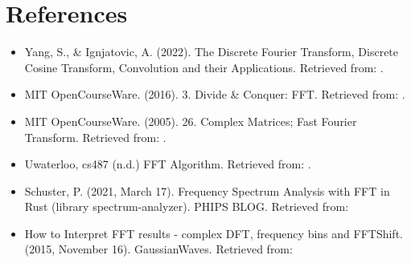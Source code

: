 \documentclass[12pt]{article}
\begin{document}
	\section{References}
 		\begin{itemize}
 			\item Yang, S., \& Ignjatovic, A. (2022). The Discrete Fourier Transform, Discrete Cosine Transform, Convolution
 			and their Applications. Retrieved from:
 			.
 			
 			\item MIT OpenCourseWare. (2016). 3. Divide \& Conquer: FFT. Retrieved from: .
 			
 			\item MIT OpenCourseWare. (2005). 26. Complex Matrices; Fast Fourier Transform. Retrieved from: .
 			
 			\item Uwaterloo, cs487 (n.d.) FFT Algorithm. Retrieved from: .
 			
 			\item Schuster, P. (2021, March 17). Frequency Spectrum Analysis with FFT in Rust (library spectrum-analyzer). PHIPS BLOG. Retrieved from: 
 			
 			\item How to Interpret FFT results - complex DFT, frequency bins and FFTShift. (2015, November 16). GaussianWaves. Retrieved from: 
 			

 		\end{itemize}
	
\end{document}
